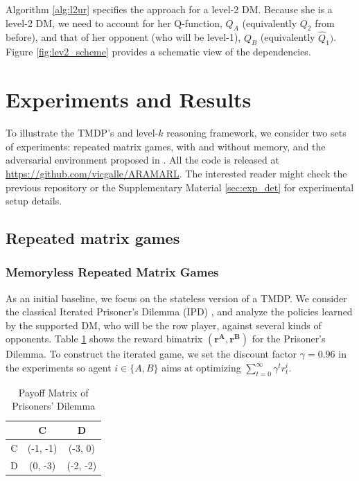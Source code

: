 \documentclass[letterpaper]{article} %
\begin{document}
Algorithm \ref{alg:l2ur} specifies the approach
for a level-2 DM. Because she is a level-2 DM, we need to account for her Q-function, $Q_A$ (equivalently $Q_2$ from before), and that of her opponent (who will be level-1), $Q_B$ (equivalently $\hat{Q}_1)$. Figure \ref{fig:lev2_scheme} provides a schematic view of the dependencies.



\section{Experiments and Results}



To illustrate the TMDP's and level-$k$ reasoning framework, we consider two sets of experiments: repeated matrix games, with and without memory, and the adversarial environment proposed in \cite{leike2017ai}. All the code is released at \url{https://github.com/vicgalle/ARAMARL}.
The interested reader might check the previous repository or the Supplementary Material \ref{sec:exp_det} for experimental setup details.

\subsection{Repeated matrix games}

\subsubsection{Memoryless Repeated Matrix Games}

As an initial baseline, we focus on the stateless version of a TMDP. We consider the classical Iterated Prisoner's Dilemma (IPD) \cite{axelrod84}, and
analyze the policies learned by the supported DM, who will be the row player, against several kinds of opponents. Table \ref{tab:payoffIPD} shows the reward bimatrix $(\mathbf{r^A}, \mathbf{r^B})$ for the Prisoner's Dilemma. To construct the
iterated game, we set the discount factor $\gamma = 0.96$ in the experiments so agent $ i \in \lbrace A, B \rbrace $ aims at optimizing $\sum_{t=0}^{\infty} \gamma^t r^i_{t}$.

\begin{table}[h]
\begin{center}
\begin{tabular}{c|c|c}
\hline
 & C & D \\
\hline
C & (-1, -1) & (-3, 0) \\
\hline
D & (0, -3) & (-2, -2)  \\
\hline
\end{tabular}
\end{center}
\caption{Payoff Matrix of Prisoners' Dilemma}
\label{tab:payoffIPD}
\end{table}
\end{document}

